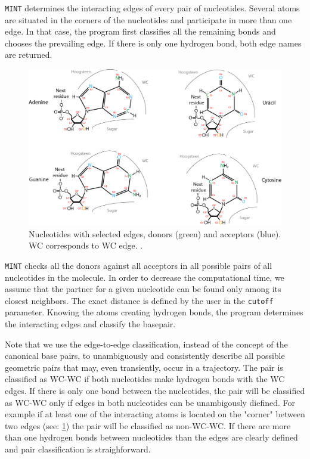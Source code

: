 \documentclass[12pt]{article}
\begin{document}
{\tt MINT} determines the interacting edges of every pair of nucleotides. Several atoms are situated in the corners of the nucleotides and participate in more than one edge. In that case, the program first classifies all the remaining bonds and chooses the prevailing edge. If there is only one hydrogen bond, both edge names are returned. 

\begin{figure}[h!]
\centering
\includegraphics[width = 14cm]{./pictures/donors_acceptors_nucleotides.png}
\caption{Nucleotides with selected edges, donors (green) and acceptors (blue). WC corresponds to WC edge.  \cite{Lescoute2006}.}
\label{Edges}
\end{figure}

{\tt MINT} checks all the donors against all acceptors in all possible pairs of all nucleotides in the molecule. In order to decrease the computational time, we assume that the partner for a given nucleotide can be found only among its closest neighbors. The exact distance is defined by the user in the {\tt cutoff} parameter. Knowing the atoms creating hydrogen bonds, the program  determines the interacting edges and classify the basepair.

Note that we use the edge-to-edge classification, instead of the concept of the canonical base pairs, to unambiguously and consistently describe all possible geometric pairs that may, even transiently, occur in a trajectory.
The pair is classified as WC-WC if both nucleotides make hydrogen bonds with the WC edges. If there is only one bond between the nucleotides, the pair will be classified as WC-WC only if edges in both nucleotides can be unambigously diefined. For example if at least one of the interacting atoms is located on the "corner" between two edges (see: \ref{Edges}) the pair will be classified as non-WC-WC. If there are more than one hydrogen bonds between nucleotides than the edges are clearly defined and pair classification is straighforward. 
\end{document}
